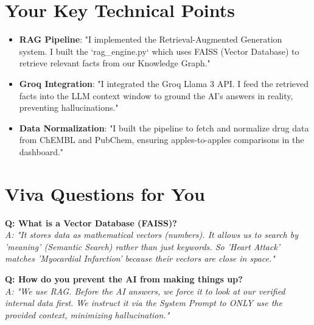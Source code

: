 \documentclass[a4paper,11pt]{report}
\begin{document}
\section{Your Key Technical Points}
\begin{itemize}
    \item \textbf{RAG Pipeline}: "I implemented the Retrieval-Augmented Generation system. I built the `rag_engine.py` which uses FAISS (Vector Database) to retrieve relevant facts from our Knowledge Graph."
    \item \textbf{Groq Integration}: "I integrated the Groq Llama 3 API. I feed the retrieved facts into the LLM context window to ground the AI's answers in reality, preventing hallucinations."
    \item \textbf{Data Normalization}: "I built the pipeline to fetch and normalize drug data from ChEMBL and PubChem, ensuring apples-to-apples comparisons in the dashboard."
\end{itemize}

\section{Viva Questions for You}
\textbf{Q: What is a Vector Database (FAISS)?} \\
\textit{A: "It stores data as mathematical vectors (numbers). It allows us to search by 'meaning' (Semantic Search) rather than just keywords. So 'Heart Attack' matches 'Myocardial Infarction' because their vectors are close in space."}

\textbf{Q: How do you prevent the AI from making things up?} \\
\textit{A: "We use RAG. Before the AI answers, we force it to look at our verified internal data first. We instruct it via the System Prompt to ONLY use the provided context, minimizing hallucination."}
\end{document}
